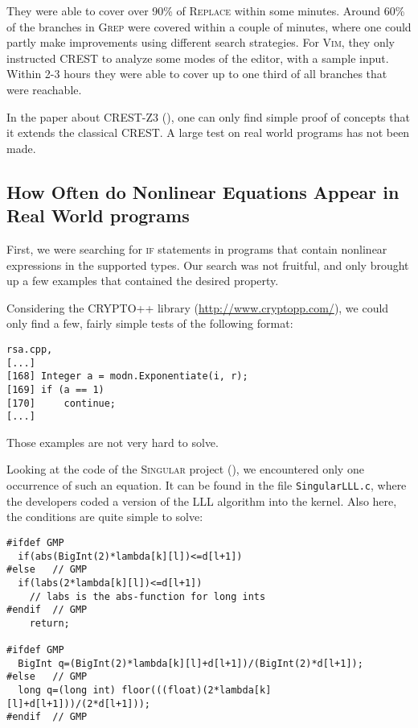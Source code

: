 \documentclass[oribibl]{llncs}
\begin{document}
They were able to cover over 90\% of \textsc{Replace} within some
minutes. Around 60\% of the branches in \textsc{Grep} were covered
within a couple of minutes, where one could partly make improvements
using different search strategies. For \textsc{Vim}, they only instructed \textsc{CREST} to analyze some modes of the editor, with a
sample input. Within 2-3 hours they were able to cover up to one third
of all branches that were reachable.

In the paper about \textsc{CREST-Z3} (\cite{CRESTZ3}), one can only
find simple proof of concepts that it extends the classical
\textsc{CREST}. A large test on real world programs has not been made.

\subsection{How Often do Nonlinear Equations Appear in Real World
  programs}

First, we were searching for \textsc{if} statements in programs that
contain nonlinear expressions in the supported types. Our search was
not fruitful, and only brought up a few examples that contained the
desired property.

Considering the \textsc{CRYPTO++} library
(\url{http://www.cryptopp.com/}), we could only find a few, fairly
simple tests of the following format:

\begin{verbatim}
rsa.cpp,
[...]
[168] Integer a = modn.Exponentiate(i, r);
[169] if (a == 1)
[170]     continue;
[...]
\end{verbatim}

Those examples are not very hard to solve.

Looking at the code of the \textsc{Singular} project
(\cite{Singular:2012}), we encountered only one occurrence of such an
equation. It can be found in the file \texttt{SingularLLL.c}, where
the developers coded a version of the \textsc{LLL} algorithm %
 into the kernel. Also here, the conditions are quite simple to solve:
\begin{verbatim}
#ifdef GMP
  if(abs(BigInt(2)*lambda[k][l])<=d[l+1])
#else   // GMP
  if(labs(2*lambda[k][l])<=d[l+1])
    // labs is the abs-function for long ints
#endif  // GMP
    return;

#ifdef GMP
  BigInt q=(BigInt(2)*lambda[k][l]+d[l+1])/(BigInt(2)*d[l+1]);
#else   // GMP
  long q=(long int) floor(((float)(2*lambda[k][l]+d[l+1]))/(2*d[l+1]));
#endif  // GMP
\end{verbatim}
\end{document}
